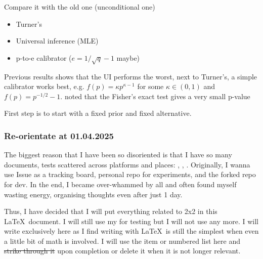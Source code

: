 Compare it with the old one (unconditional one)
\begin{itemize}
	\item Turner's
	\item Universal inference (MLE)
	\item p-to-e calibrator ($e = 1/\sqrt{q} - 1$ maybe)
\end{itemize}

Previous results shows that the UI performs the worst, next to Turner's,
a simple calibrator works best, e.g. $f(p) = \kappa p^{\kappa-1}$ for some $\kappa \in(0,1)$
and $f(p) = p^{-1/2}-1$.
noted that the Fisher's exact test gives a very small p-value

First step is to start with a fixed prior and fixed alternative.

\subsubsection{Re-orientate at 01.04.2025}

The biggest reason that I have been so disoriented is that I have so many documents, tests
scattered across platforms and places: \githubIssue, \personalRepo, \forkedRepo.
Originally, I wanna use Issue as a tracking board, personal repo for experiments,
and the forked repo for dev.
In the end, I became over-whammed by all and often found myself wasting energy,
organising thoughts even after just 1 day.

Thus, I have decided that I will put everything related to 2x2 in this \LaTeX\ document.
I will still use my \personalRepo for testing but I will not use \githubIssue any more.
I will write exclusively here as I find writing with \LaTeX\ is still the simplest
when even a little bit of math is involved.
I will use the item or numbered list here and \sout{strike through it} upon completion
or delete it when it is not longer relevant.
